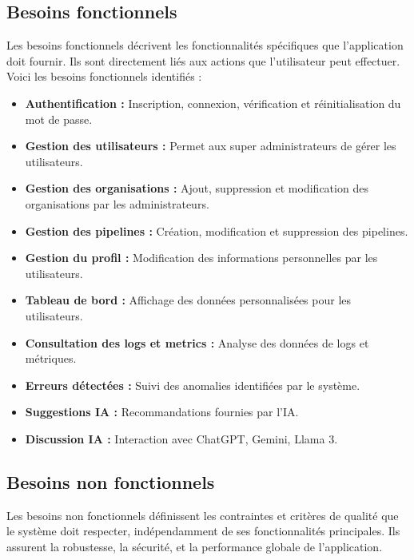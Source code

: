 \subsection{Besoins fonctionnels}
Les besoins fonctionnels décrivent les fonctionnalités spécifiques que l'application doit fournir. Ils sont directement liés aux actions que l'utilisateur peut effectuer. Voici les besoins fonctionnels identifiés :

\begin{itemize}[label=\textbullet]
    \item \textbf{Authentification :} Inscription, connexion, vérification et réinitialisation du mot de passe.
    \item \textbf{Gestion des utilisateurs :} Permet aux super administrateurs de gérer les utilisateurs.
    \item \textbf{Gestion des organisations :} Ajout, suppression et modification des organisations par les administrateurs.
    \item \textbf{Gestion des pipelines :} Création, modification et suppression des pipelines.
    \item \textbf{Gestion du profil :} Modification des informations personnelles par les utilisateurs.
    \item \textbf{Tableau de bord :} Affichage des données personnalisées pour les utilisateurs.
    \item \textbf{Consultation des logs et metrics :} Analyse des données de logs et métriques.
    \item \textbf{Erreurs détectées :} Suivi des anomalies identifiées par le système.
    \item \textbf{Suggestions IA :} Recommandations fournies par l’IA.
    \item \textbf{Discussion IA :} Interaction avec ChatGPT, Gemini, Llama 3.
\end{itemize}

\subsection{Besoins non fonctionnels}
Les besoins non fonctionnels définissent les contraintes et critères de qualité que le système doit respecter, indépendamment de ses fonctionnalités principales. Ils assurent la robustesse, la sécurité, et la performance globale de l’application.


